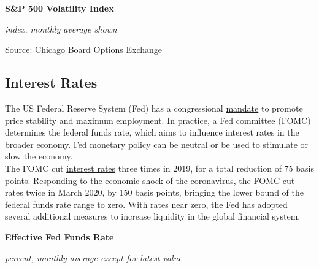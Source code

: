 \documentclass{report}
\makeatletter
\newcommand{\tbllink}[1]{\href{https://raw.githubusercontent.com/bdecon/US-chartbook/master/chartbook/data/#1}{\faTable}}
\newcommand*\short[1]{\expandafter\@gobbletwo\number\numexpr#1\relax}
\newcommand{\dateaxisticks}{
		date coordinates in=x, axis line style={draw=none},
		xmax={2020-10-01},
		max space between ticks=40,	    
		xtick={{1990-01-01}, {1992-01-01}, {1994-01-01}, 
			{1996-01-01}, {1998-01-01}, {2000-01-01}, 
			{2002-01-01}, {2004-01-01}, {2006-01-01},
			{2008-01-01}, {2010-01-01}, {2012-01-01}, {2014-01-01},
		    {2016-01-01}, {2018-01-01}, {2020-01-01}},
		minor xtick={{1989-01-01}, {1991-01-01}, {1993-01-01},
			{1995-01-01}, {1997-01-01}, {1999-01-01}, 
			{2001-01-01}, {2003-01-01}, {2005-01-01}, {2007-01-01},
		    {2009-01-01}, {2011-01-01}, {2013-01-01}, {2015-01-01},
		    {2017-01-01}, {2019-01-01}},
		enlarge y limits={0.06}, enlarge x limits={0.01},
		}
\newcommand{\bbar}[2]{extra #1 ticks = {{#2}}, extra #1 tick labels = ,
		extra #1 tick style = {grid=major, grid style={thick, black!25}},}
\newcommand{\stdline}[4]{\addplot[very thick, no markers, color=#1] 
		table [x=#2, y=#3, col sep=comma] {#4};	}
\newcommand{\rbars}{
		\fill[color=black!10] (axis cs:{1990-07-01},\pgfkeysvalueof{/pgfplots/ymin}) rectangle 
			(axis cs:{1991-03-01}, \pgfkeysvalueof{/pgfplots/ymax});
		\fill[color=black!10] (axis cs:{2007-12-01},\pgfkeysvalueof{/pgfplots/ymin}) rectangle 
			(axis cs:{2009-07-01}, \pgfkeysvalueof{/pgfplots/ymax});
		\fill[color=black!10] (axis cs:{2001-03-01},\pgfkeysvalueof{/pgfplots/ymin}) rectangle 
			(axis cs:{2001-11-01}, \pgfkeysvalueof{/pgfplots/ymax});
		\fill[color=black!10] (axis cs:{2020-02-01},\pgfkeysvalueof{/pgfplots/ymin}) rectangle 
			(axis cs:{2020-10-01}, \pgfkeysvalueof{/pgfplots/ymax});}
\makeatother
\begin{document}
{{{{{{{{{\begin{minipage}{0.76\textwidth}
\normalsize \textbf{S\&P 500 Volatility Index}

\footnotesize{\textit{index, monthly average shown}}

\hspace*{-2mm} 

\footnotesize{Source: Chicago Board Options Exchange} \hfill \tbllink{vix.csv}
\end{minipage}
\newpage
\begin{minipage}{0.76\textwidth}
\subsection*{\color{black!70} \seriffont Interest Rates}
\small The US Federal Reserve System (Fed) has a congressional \href{https://www.federalreserve.gov/faqs/money_12848.htm}{mandate} to promote price stability and maximum employment. In practice, a Fed committee (FOMC) determines the federal funds rate, which aims to influence interest rates in the broader economy. Fed monetary policy can be neutral or be used to stimulate or slow the economy.\\

The FOMC cut \href{https://www.federalreserve.gov/releases/h15/}{interest rates} three times in 2019, for a total reduction of 75 basis points. Responding to the economic shock of the coronavirus, the FOMC cut rates twice in March 2020, by 150 basis points, bringing the lower bound of the federal funds rate range to zero. With rates near zero, the Fed has adopted several additional measures to increase liquidity in the global financial system.

\vspace{4mm}

\normalsize \textbf{Effective Fed Funds Rate}

\footnotesize{\textit{percent, monthly average except for latest value }}
 
\hspace*{-2mm} 


\end{minipage}}}}}}}}}}
\end{document}
